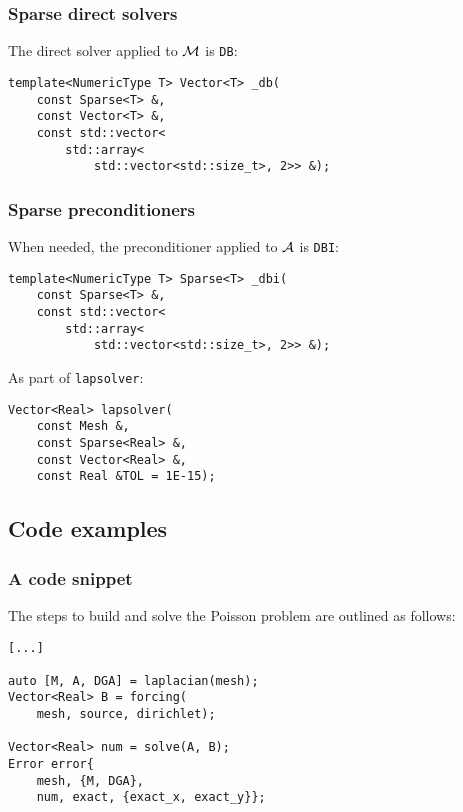 \begin{frame}[fragile]
    \frametitle{Sparse direct solvers}

    The direct solver applied to $\mathcal{M}$ is \lstinline{DB}:

\begin{lstlisting}[style=cpp]
template<NumericType T> Vector<T> _db(
    const Sparse<T> &, 
    const Vector<T> &, 
    const std::vector<
        std::array<
            std::vector<std::size_t>, 2>> &);
\end{lstlisting}
\end{frame}

\begin{frame}[fragile]
    \frametitle{Sparse preconditioners}

    When needed, the preconditioner applied to $\mathcal{A}$ is \lstinline{DBI}:

\begin{lstlisting}[style=cpp]
template<NumericType T> Sparse<T> _dbi(
    const Sparse<T> &, 
    const std::vector<
        std::array<
            std::vector<std::size_t>, 2>> &);
\end{lstlisting}

    As part of \lstinline{lapsolver}:

\begin{lstlisting}[style=cpp]
Vector<Real> lapsolver(
    const Mesh &, 
    const Sparse<Real> &, 
    const Vector<Real> &, 
    const Real &TOL = 1E-15);
\end{lstlisting}
\end{frame}

\subsection{Code examples}

\begin{frame}[fragile]
    \frametitle{A code snippet}

    The steps to build and solve the Poisson problem are outlined as follows:

\begin{lstlisting}[style=cpp]
[...]

auto [M, A, DGA] = laplacian(mesh);
Vector<Real> B = forcing(
    mesh, source, dirichlet);

Vector<Real> num = solve(A, B);
Error error{
    mesh, {M, DGA}, 
    num, exact, {exact_x, exact_y}};
\end{lstlisting}

\end{frame}
